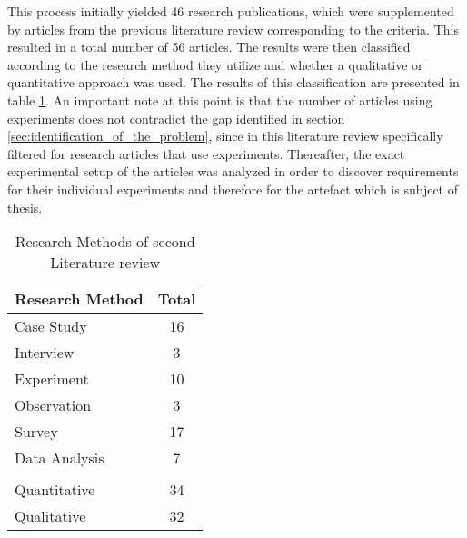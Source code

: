 
This process initially yielded 46 research publications, which were supplemented by articles from the previous literature review corresponding to the criteria. This resulted in a total number of 56 articles. The results were then classified according to the research method they utilize and whether a qualitative or quantitative approach was used. The results of this classification are presented in table \ref{tab:secondLiteratureSearch}. An important note at this point is that the number of articles using experiments does not contradict the gap identified in section \ref{sec:identification_of_the_problem}, since in this literature review specifically filtered for research articles that use experiments. Thereafter, the exact experimental setup of the articles was analyzed in order to discover requirements for their individual experiments and therefore for the artefact which is subject of thesis.

\begin{table}[htbp]
    \centering
    \small
    \begin{tabular}{ll}
    \hline
    \multicolumn{1}{l}{Research Method} & \multicolumn{1}{l}{Total} \\ \hline
    \multicolumn{1}{l}{Case  Study}     & \multicolumn{1}{c}{16}    \\ 
    \multicolumn{1}{l}{Interview}       & \multicolumn{1}{c}{3}     \\ 
    \multicolumn{1}{l}{Experiment}      & \multicolumn{1}{c}{10}    \\ 
    \multicolumn{1}{l}{Observation}     & \multicolumn{1}{c}{3}     \\ 
    \multicolumn{1}{l}{Survey}          & \multicolumn{1}{c}{17}    \\ 
    \multicolumn{1}{l}{Data Analysis}   & \multicolumn{1}{c}{7}     \\ 
                                            &                            \\ \hline
    \multicolumn{1}{l}{Quantitative}    & \multicolumn{1}{c}{34}    \\ 
    \multicolumn{1}{l}{Qualitative}     & \multicolumn{1}{c}{32}    \\ \hline
    \end{tabular}
    \caption[Research Methods of second Literature review]{Research Methods of second Literature review}\label{tab:secondLiteratureSearch}
    \end{table}

